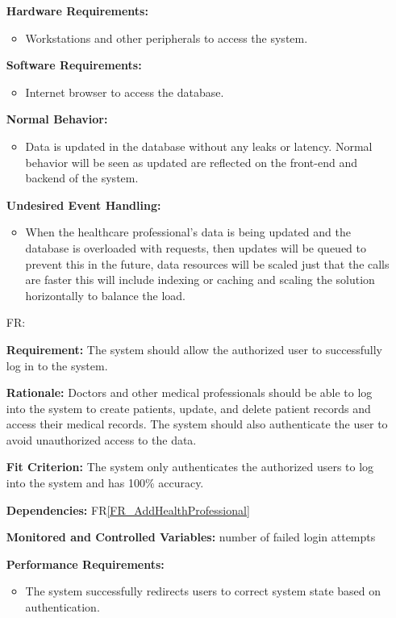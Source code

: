 \documentclass[12pt]{article}
\newcounter{reqnum} %
\begin{document}
\begin{itemize}
\textbf{Hardware Requirements:}
\begin{itemize}
  \item Workstations and other peripherals to access the system.
\end{itemize} 

\textbf{Software Requirements:}
\begin{itemize}
  \item Internet browser to access the database.
\end{itemize} 

\textbf{Normal Behavior:}
\begin{itemize}
  \item Data is updated in the database without any leaks or latency. Normal behavior will be seen as updated are reflected on the front-end and backend of the system.
\end{itemize} 

\textbf{Undesired Event Handling:}
\begin{itemize}
  \item When the healthcare professional’s data is being updated and the database is overloaded with requests, then updates will be queued to prevent this in the future, data resources will be scaled just that the calls are faster this will include indexing or caching and scaling the solution horizontally to balance the load.
\end{itemize} 

\item[FR\refstepcounter{reqnum}\thereqnum \label{FR_login}:]

\textbf{Requirement:} The system should allow the authorized user to successfully log in to the system.

\textbf{Rationale:} Doctors and other medical professionals should be able to log into the system to create patients, update, and delete patient records and access their medical records. The system should also authenticate the user to avoid unauthorized access to the data.

\textbf{Fit Criterion:} The system only authenticates the authorized users to log into the system and has 100\% accuracy. 

\textbf{Dependencies:} FR\ref{FR_AddHealthProfessional}

\textbf{Monitored and Controlled Variables:} number of failed login attempts

\textbf{Performance Requirements:} 
\begin{itemize}
  \item The system successfully redirects users to correct system state based on authentication.
\end{itemize}


\end{itemize}
\end{document}
